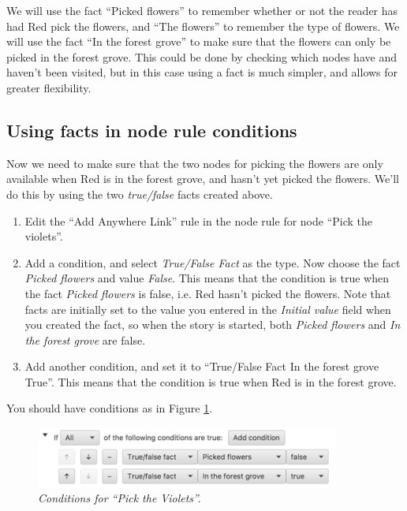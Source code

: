 \documentclass{article}
\begin{document}
We will use the fact ``Picked flowers'' to remember whether or not the reader has had Red pick the flowers, and ``The flowers'' to remember the type of flowers. We will use the fact ``In the forest grove'' to make sure that the flowers can only be picked in the forest grove. This could be done by checking which nodes have and haven't been visited, but in this case using a fact is much simpler, and allows for greater flexibility.

\subsection{Using facts in node rule conditions}

Now we need to make sure that the two nodes for picking the flowers are only available when Red is in the forest grove, and hasn't yet picked the flowers. We'll do this by using the two \textit{true/false} facts created above.

\begin{enumerate}
  \item Edit the ``Add Anywhere Link'' rule in the node rule for node ``Pick the violets''.
  \item Add a condition, and select \textit{True/False Fact} as the type. Now choose the fact \textit{Picked flowers} and value \textit{False}. This means that the condition is true when the fact \textit{Picked flowers} is false, i.e. Red hasn't picked the flowers. Note that facts are initially set to the value you entered in the \textit{Initial value} field when you created the fact, so when the story is started, both \textit{Picked flowers} and \textit{In the forest grove} are false.
  \item Add another condition, and set it to ``True/False Fact In the forest grove True''. This means that the condition is true when Red is in the forest grove.
\end{enumerate}

You should have conditions as in Figure \ref{fig:tut3:picktheviolets}.

\begin{figure}[h]
  \centering
  \includegraphics[width=10cm]{images/hypedyn-tutorial-3-figure-10}
  \caption{\textit{Conditions for ``Pick the Violets''.}}
  \label{fig:tut3:picktheviolets}
\end{figure}
\end{document}
